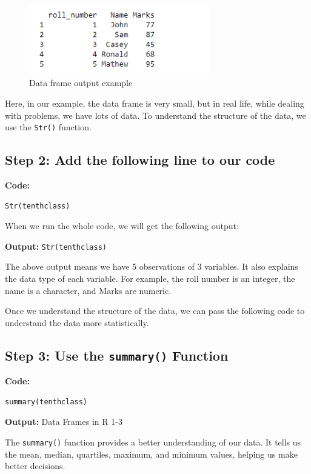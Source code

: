 \documentclass[12pt]{book}
\begin{document}
\begin{figure}[h]
    \begin{flushleft}
        \includegraphics[width=0.7\textwidth]{Data-Frames-in-R-1-1.png} %
        \caption{Data frame output example}
        \label{fig:dataframe}
    \end{flushleft}
\end{figure}
Here, in our example, the data frame is very small, but in real life, while dealing with problems, we have lots of data. To understand the structure of the data, we use the \texttt{Str()} function.

\subsection{Step 2: Add the following line to our code}

\textbf{Code:}
\begin{verbatim}
Str(tenthclass)
\end{verbatim}

When we run the whole code, we will get the following output:

\textbf{Output:}
\texttt{Str(tenthclass)}

The above output means we have 5 observations of 3 variables. It also explains the data type of each variable. For example, the roll number is an integer, the name is a character, and Marks are numeric.

Once we understand the structure of the data, we can pass the following code to understand the data more statistically.

\subsection{Step 3: Use the \texttt{summary()} Function}

\textbf{Code:}
\begin{verbatim}
summary(tenthclass)
\end{verbatim}

\textbf{Output:}
Data Frames in R 1-3

The \texttt{summary()} function provides a better understanding of our data. It tells us the mean, median, quartiles, maximum, and minimum values, helping us make better decisions.
\end{document}
